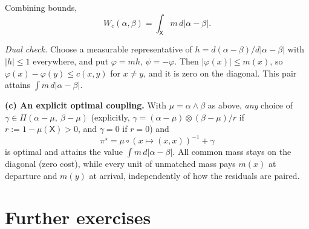 \documentclass[11pt,a4paper]{article}
\theoremstyle{exostyle}
\begin{document}
\begin{solution}
Combining bounds,
\[
\boxed{\quad W_c(\alpha,\beta)=\int_{\mathsf X} m\,d|\alpha-\beta|.\quad}
\]

\smallskip

\emph{Dual check.} Choose a measurable representative of
$h=d(\alpha-\beta)/d|\alpha-\beta|$ with $|h|\le1$ everywhere, and put
$\varphi=mh$, $\psi=-\varphi$. Then $|\varphi(x)|\le m(x)$, so
$\varphi(x)-\varphi(y)\le c(x,y)$ for $x\ne y$, and it is zero on the diagonal.
This pair attains $\int m\,d|\alpha-\beta|$.

\medskip
\textbf{(c) An explicit optimal coupling.}
With $\mu=\alpha\wedge\beta$ as above, \emph{any} choice of
$\gamma\in\Pi(\alpha-\mu,\ \beta-\mu)$ (explicitly, $\gamma=(\alpha-\mu)\otimes(\beta-\mu)/r$ if $r:=1-\mu(\mathsf X)>0$, and $\gamma=0$ if $r=0$)
and
\[
\pi^\star=\mu\circ(x\mapsto(x,x))^{-1}+\gamma
\]
is optimal and attains the value $\int m\,d|\alpha-\beta|$.
All common mass stays on the diagonal (zero cost), while every unit of unmatched mass pays $m(x)$ at departure and $m(y)$ at arrival, independently of how the residuals are paired.
\end{solution}

\section*{Further exercises}
\end{document}
